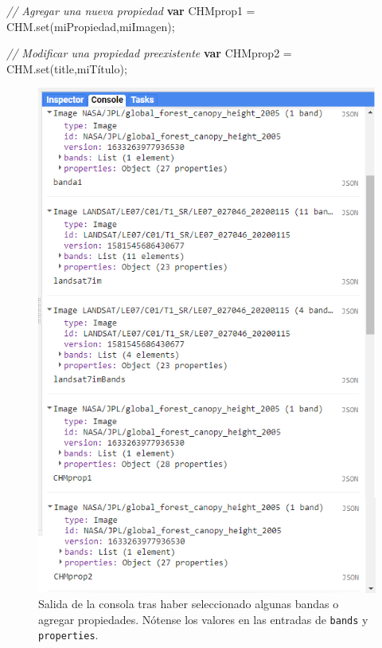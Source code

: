 \documentclass[
  12pt,
  letterpaper,
  twoside]{book}
\newenvironment{Shaded}{\begin{snugshade}}{\end{snugshade}}
\newcommand{\CommentTok}[1]{\textcolor[rgb]{0.24,0.58,0.00}{\textit{#1}}}
\newcommand{\FunctionTok}[1]{\textcolor[rgb]{0.48,0.12,0.64}{#1}}
\newcommand{\KeywordTok}[1]{\textcolor[rgb]{0.00,0.00,0.00}{\textbf{#1}}}
\newcommand{\NormalTok}[1]{#1}
\newcommand{\OperatorTok}[1]{\textcolor[rgb]{0.00,0.00,0.00}{#1}}
\newcommand{\StringTok}[1]{\textcolor[rgb]{0.87,0.29,0.22}{#1}}
\begin{document}
\begin{Shaded}
\begin{Highlighting}[]
\CommentTok{// Agregar una nueva propiedad}
\KeywordTok{var}\NormalTok{ CHMprop1 }\OperatorTok{=}\NormalTok{ CHM}\OperatorTok{.}\FunctionTok{set}\NormalTok{(}\StringTok{\textquotesingle{}miPropiedad\textquotesingle{}}\OperatorTok{,}\StringTok{\textquotesingle{}miImagen\textquotesingle{}}\NormalTok{)}\OperatorTok{;}

\CommentTok{// Modificar una propiedad preexistente}
\KeywordTok{var}\NormalTok{ CHMprop2 }\OperatorTok{=}\NormalTok{ CHM}\OperatorTok{.}\FunctionTok{set}\NormalTok{(}\StringTok{\textquotesingle{}title\textquotesingle{}}\OperatorTok{,}\StringTok{\textquotesingle{}miTítulo\textquotesingle{}}\NormalTok{)}\OperatorTok{;}
\end{Highlighting}
\end{Shaded}




\begin{figure}[H]

{\centering \includegraphics[width=0.8\linewidth]{Img/ej275} 

}

\caption{Salida de la consola tras haber seleccionado algunas bandas o agregar propiedades. Nótense los valores en las entradas de \texttt{bands} y \texttt{properties}.}\label{fig:f95}
\end{figure}
\end{document}
